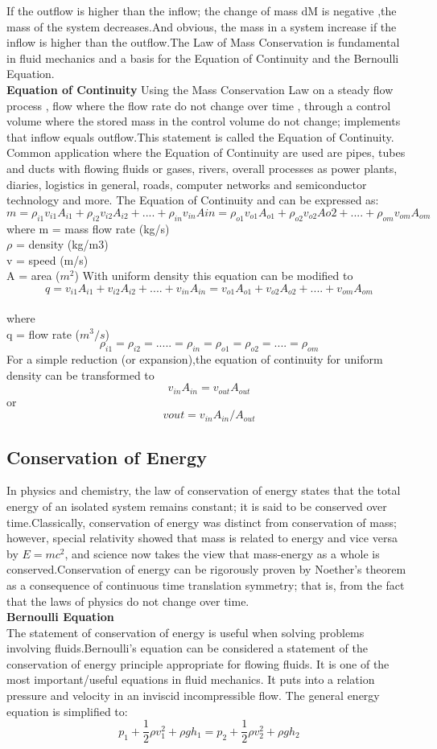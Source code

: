 \documentclass[a4paper,12pt]{report}
\begin{document}
{If the outflow is higher than the inflow; the change of mass dM is negative ,the mass of the system decreases.And obvious, the mass in a system increase if the inflow is higher than the outflow.The Law of Mass Conservation is fundamental in fluid mechanics and a basis for the Equation of Continuity and the Bernoulli Equation.\\
\textbf{Equation of Continuity}
Using the Mass Conservation Law on a steady flow process , flow where the flow rate do not change over time , through a control volume where the stored mass in the control volume do not change; implements that inflow equals outflow.This statement is called the Equation of Continuity. Common application where the Equation of Continuity are used are pipes, tubes and ducts with flowing fluids or gases, rivers, overall processes as power plants, diaries, logistics in general, roads, computer networks and semiconductor technology and more.
The Equation of Continuity and can be expressed as:
$$m=\rho_{i1}v_{i1}A_{i1}+\rho_{i2}v_{i2}A_{i2}+....+\rho_{in}v_{in}A{in}=\rho_{o1}v_{o1}A_{o1}+\rho_{o2}v_{o2}Ao2+....+\rho_{om}v_{om}A_{om}$$
where
m = mass flow rate (kg/s)\\
$\rho$ = density (kg/m3)\\
v = speed (m/s)\\
A = area ($m^2$)
With uniform density this equation can be modified to
$$q=v_{i1}A_{i1}+v_{i2}A_{i2}+....+v_{in}A_{in}=v_{o1}A_{o1}+v_{o2}A_{o2}+....+v_{om}A_{om}$$\\               where\\
q = flow rate ($m^3/s$)\\
$$\rho_{i1} = \rho_{i2} = ..... = \rho_{in} = \rho_{o1} = \rho_{o2} = .... = \rho_{om}$$
For a simple reduction (or expansion),the equation of continuity for uniform density can be transformed to
$$v_{in} A_{in} = v_{out} A_{out}$$                             or
$$vout = v_{in} A_{in} / A_{out}$$ 
\subsection{Conservation of Energy}
In physics and chemistry, the law of conservation of energy states that the total energy of an isolated system remains constant; it is said to be conserved over time.Classically, conservation of energy was distinct from conservation of mass; however, special relativity showed that mass is related to energy and vice versa by $E = mc^2$, and science now takes the view that mass-energy as a whole is conserved.Conservation of energy can be rigorously proven by Noether's theorem as a consequence of continuous time translation symmetry; that is, from the fact that the laws of physics do not change over time.\\
\textbf{Bernoulli Equation}\\
The statement of conservation of energy is useful when solving problems involving fluids.Bernoulli’s equation can be considered a statement of the conservation of energy principle appropriate for flowing fluids. It is one of the most important/useful equations in fluid mechanics. It puts into a relation pressure and velocity in an inviscid incompressible flow. The general energy equation is simplified to:
$$p_1 + \frac{1}{2}\rho v_{1}^{2} + \rho gh_1 = p_2 + \frac{1}{2}\rho v_{2}^{2} + \rho gh_2$$
}
\end{document}
